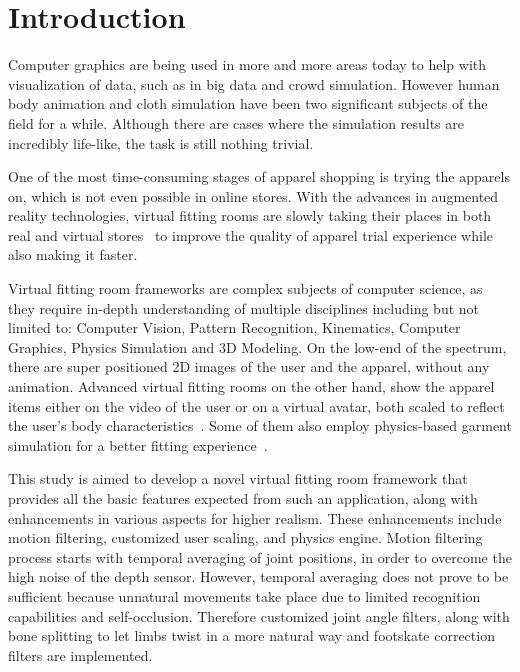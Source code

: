 \chapter{Introduction}
\label{chapter_introduction}

Computer graphics are being used in more and more areas today to help with visualization of data, such as in big data and crowd simulation.
However human body animation and cloth simulation have been two significant subjects of the field for a while. 
Although there are cases where the simulation results are incredibly life-like, the task is still nothing trivial. 

One of the most time-consuming stages of apparel shopping is trying the apparels on, which is not even possible in online stores. 
With the advances in augmented reality technologies, virtual fitting rooms are slowly taking their places in both real and virtual 
stores~\cite{Fitnect2012,Styku2013} to improve the quality of apparel trial experience while also making it faster.

Virtual fitting room frameworks are complex subjects of computer science, as they require in-depth understanding of multiple disciplines 
including but not limited to: Computer Vision, Pattern Recognition, Kinematics, Computer Graphics, Physics Simulation and 3D Modeling. 
On the low-end of the spectrum, there are super positioned 2D images of the user and the apparel, without any animation.
Advanced virtual fitting rooms on the other hand, show the apparel items either on the video 
of the user or on a virtual avatar, both scaled to reflect the user's body 
characteristics~\cite{FaceCake2013}. Some of them also employ physics-based 
garment simulation for a better fitting experience~\cite{Styku2013}.

This study is aimed to develop a novel virtual fitting room framework that provides all the basic 
features expected from such an application, along with enhancements in various 
aspects for higher realism. These enhancements include motion filtering, 
customized user scaling, and physics engine. Motion filtering process 
starts with temporal averaging of joint positions,
in order to overcome the high noise of the depth sensor. However, temporal
averaging does not prove to be sufficient because unnatural movements take
place due to limited recognition capabilities and self-occlusion.
Therefore customized joint angle filters, along with bone
splitting to let limbs twist in a more natural way and footskate correction filters are implemented.

